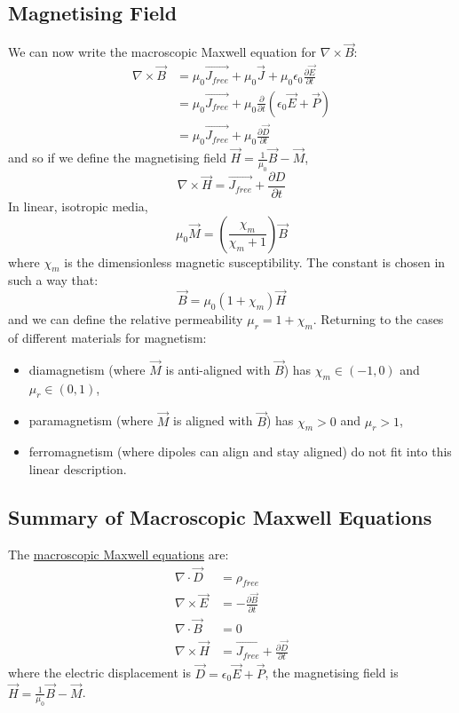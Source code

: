 \documentclass[../Main.tex]{subfiles}
\begin{document}
\subsection{Magnetising Field}
We can now write the macroscopic Maxwell equation for $\nabla \times \vec{B}$:
\begin{align*}
    \nabla \times \vec{B} &= \mu_0 \vec{J_{free}} + \mu_0 \vec J + \mu_0 \epsilon_0 \frac{\partial \vec E}{\partial t} \\
    &= \mu_0 \vec{J_{free}} + \mu_0 \frac{\partial}{\partial t} \left(\epsilon_0 \vec E + \vec P\right) \\
    &= \mu_0 \vec{J_{free}} + \mu_0 \frac{\partial \vec D}{\partial t} 
\end{align*}
and so if we define the magnetising field $\vec H = \frac1{\mu_0} \vec B - \vec M$,
\begin{equation*}
    \nabla \times \vec{H} = \vec{J_{free}} + \frac{\partial D}{\partial t}
\end{equation*}
In linear, isotropic media, 
\begin{equation*}
    \mu_0 \vec M = \left(\frac{\chi_m}{\chi_m + 1}\right) \vec B
\end{equation*}
where $\chi_m$ is the dimensionless magnetic susceptibility. The constant is chosen in such a way that:
\begin{equation*}
    \vec B = \mu_0 (1 + \chi_m) \vec H
\end{equation*}
and we can define the relative permeability $\mu_r = 1 + \chi_m$. Returning to the cases of different materials for magnetism:
\begin{itemize}
    \item diamagnetism (where $\vec M$ is anti-aligned with $\vec B$) has $\chi_m \in (-1, 0)$ and $\mu_r \in (0, 1)$,
    \item paramagnetism (where $\vec M$ is aligned with $\vec B$) has $\chi_m > 0$ and $\mu_r > 1$,
    \item ferromagnetism (where dipoles can align and stay aligned) do not fit into this linear description.
\end{itemize}
\subsection{Summary of Macroscopic Maxwell Equations}
The \underline{macroscopic Maxwell equations} are:
\begin{align*}
    \nabla \cdot \vec{D} &= \rho_{free} \\
    \nabla \times \vec{E} &= - \frac{\partial \vec B}{\partial t} \\
    \nabla \cdot \vec{B} &= 0 \\
    \nabla \times \vec{H} &= \vec{J_{free}} + \frac{\partial \vec D}{\partial t}
\end{align*}
where the electric displacement is $\vec D = \epsilon_0 \vec E + \vec P$, the magnetising field is $\vec H = \frac1{\mu_0} \vec B - \vec M$.
\end{document}
